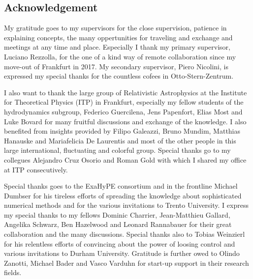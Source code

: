 \begin{fullwidth} %
	\chapter*{Acknowledgement}
	
	My gratitude goes to my supervisors for the close supervision, patience in
	explaining concepts, the many oppertunities for traveling and exchange
	and meetings at any time and place. Especially I thank my primary supervisor,
	Luciano Rezzolla, for the one of a kind way of remote collaboration since my
	move-out of Frankfurt in 2017. My secondary supervisor, Piero Nicolini,
	is expressed my special thanks for the countless cofees in Otto-Stern-Zentrum.
	
	I also want to thank the large group of Relativistic Astrophysics
	at the Institute for Theoretical Physics (ITP) in Frankfurt,
    especially my fellow students of the hydrodynamics subgroup,
	Federico Guercilena, Jens Papenfort, Elias Most and Luke Bovard for
    many fruitful discussions and exchange of the knowledge.
	I also benefited from insights provided by Filipo Galeazzi,
	Bruno Mundim, Matthias Hanauske and Mariafelicia De Laurentis and most
	of the other people in this large international, fluctuating and colorful
	group.	
	Special thanks go to my collegues Alejandro Cruz Osorio and 
	Roman Gold with which I shared my office at ITP consecutively.

	
	Special thanks goes to the ExaHyPE consortium and in the frontline 
	Michael Dumbser for his	tireless efforts of spreading the knowledge
	about sophisticated numerical methods and for the various invitations to
	Trento University. I express my special thanks to my fellows Dominic Charrier,
	Jean-Matthieu Gallard, Angelika Schwarz, Ben Hazelwood and
	Leonard Rannabauer for their great
	collaboration and the many discussions. Special thanks also
	to Tobias Weinzierl for his relentless efforts of convincing about the
	power of loosing control and various invitations to Durham University.
	Gratitude is further owed to Olindo Zanotti, Michael Bader and
	Vasco Varduhn for start-up support in their research fields.
	

\end{fullwidth}
